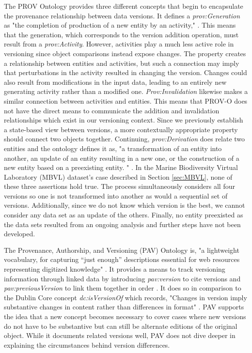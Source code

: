 The PROV Ontology provides three different concepts that begin to encapsulate the provenance relationship between data versions.
It defines a \textit{prov:Generation} as "the completion of production of a new entity by an activity," \cite{Lebo2013}.
This means that the generation, which corresponds to the version addition operation, must result from a \textit{prov:Activity}.
However, activities play a much less active role in versioning since object comparisons instead expose changes.
The property creates a relationship between entities and activities, but such a connection may imply that perturbations in the activity resulted in changing the version.
Changes could also result from modifications in the input data, leading to an entirely new generating activity rather than a modified one.
\textit{Prov:Invalidation} likewise makes a similar connection between activities and entities.
This means that PROV-O does not have the direct means to communicate the addition and invalidation relationships which exist in our versioning context.
Since we previously establish a state-based view between versions, a more contextually appropriate property should connect two objects together.
Continuing, \textit{prov:Derivation} does relate two entities and the ontology defines it as, "a transformation of an entity into another, an update of an entity resulting in a new one, or the construction of a new entity based on a preexisting entity. " \cite{Lebo2013}.
In the Marine Biodiversity Virtual Laboratory (MBVL) dataset's case described in Section \ref{sec:MBVL}, none of these three assertions hold true. 
The process simultaneously considers all four versions so one is not transformed into another as would a sequential set of versions.
Additionally, since we do not know which version is the best, we cannot consider any data set as an update of the others.
Finally, no entity preexisted as the data sets resulted from an ongoing analysis and further steps have not been developed.

The Provenance, Authorship, and Versioning (PAV) Ontology is, "a lightweight vocabulary, for capturing ``just enough” descriptions essential for web resources representing digitized knowledge" \cite{Ciccarese2013}.
It provides a means to track versioning information through linked data by introducing \textit{pav:version} to cite versions and \textit{pav:previousVersion} to link them together in order \cite{Ciccarese2013}.
It does so in comparison to the Dublin Core concept \textit{dc:isVersionOf} which records, "Changes in version imply substantive changes in content rather than differences in format" \cite{DCMI2012}.
PAV supports the idea that a new concept becomes necessary to cover cases where new versions do not have to be substantive but can still be alternate editions of the original object.
While it documents related versions well, PAV does not dive deeper in explaining the circumstances behind version differences.

